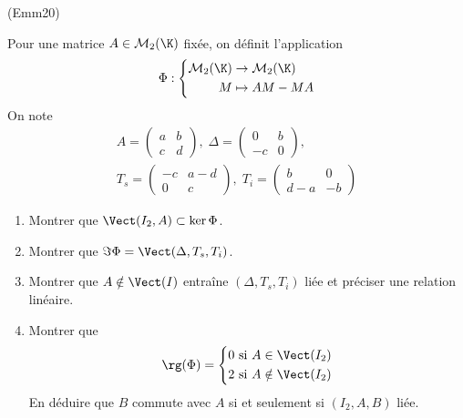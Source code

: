 \begin{tiny}(Emm20)\end{tiny} Pour une matrice $A\in \mathcal{M}_2(\K)$ fixée, on définit l'application
\begin{displaymath}
  \Phi:
\left\lbrace 
\begin{aligned}
\mathcal{M}_2(\K) &\rightarrow \mathcal{M}_2(\K) \\
M &\mapsto AM -MA
\end{aligned}
\right. 
\end{displaymath}
On note
\begin{multline*}
  A =
\begin{pmatrix}
a & b \\ c & d  
\end{pmatrix},\;
\Delta =
\begin{pmatrix}
0 & b \\ -c & 0  
\end{pmatrix},\\
T_s =
\begin{pmatrix}
-c & a-d \\ 0 & c  
\end{pmatrix},\;
T_i =
\begin{pmatrix}
b & 0 \\ d-a & -b  
\end{pmatrix} 
\end{multline*}
\begin{enumerate}
  \item Montrer que $\Vect(I_2,A)\subset \ker \Phi$.
  \item Montrer que $\Im \Phi = \Vect(\Delta, T_s, T_i)$.
  \item Montrer que $A\notin \Vect(I)$ entraîne $(\Delta, T_s, T_i)$ liée et préciser une relation linéaire.
  \item Montrer que
\begin{displaymath}
\rg(\Phi) = 
\left\lbrace 
\begin{aligned}
0 &\text{ si } A\in \Vect(I_2) \\ 2 &\text{ si } A\notin \Vect(I_2)  
\end{aligned}
\right. 
\end{displaymath}
En déduire que $B$ commute avec $A$ si et seulement si $(I_2,A,B)$ liée.
\end{enumerate}
